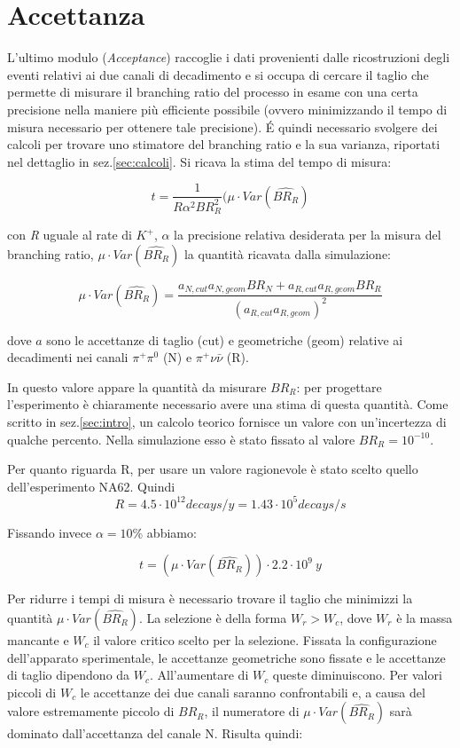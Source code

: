 \documentclass[8pt]{extarticle}
\begin{document}
\section{Accettanza} \label{sec:acceptance}
L'ultimo modulo (\textit{Acceptance}) raccoglie i dati provenienti dalle ricostruzioni degli eventi relativi ai due canali di decadimento e si occupa di cercare il taglio che permette di misurare il branching ratio del processo in esame con una certa precisione nella maniere più efficiente possibile (ovvero minimizzando il tempo di misura necessario per ottenere tale precisione). \'E quindi necessario svolgere dei calcoli per trovare uno stimatore del branching ratio e la sua varianza, riportati nel dettaglio in sez.\ref{sec:calcoli}. Si ricava la stima del tempo di misura:

$$
t = \frac{1}{R \alpha^2 BR_R^2} (\mu \cdot Var(\widehat{BR_R})
$$

con \textit{R} uguale al rate di $K^+$, $\alpha$ la precisione relativa desiderata per la misura del branching ratio, $\mu \cdot Var(\widehat{BR_R})$ la quantità ricavata dalla simulazione: 

\begin{equation}
\mu \cdot Var(\widehat{BR_R}) = \frac{a_{N,cut}a_{N,geom}BR_N + a_{R,cut}a_{R,geom}BR_R}{(a_{R,cut}a_{R,geom})^2}
\end{equation}

dove $a$ sono le accettanze di taglio (cut) e geometriche (geom) relative ai decadimenti nei canali $\pi^+ \pi^0$ (N) e $\pi^+ \nu \bar{\nu}$ (R).

In questo valore appare la quantità da misurare $BR_R$: per progettare l'esperimento è chiaramente necessario avere una stima di questa quantità. Come scritto in sez.\ref{sec:intro}, un calcolo teorico fornisce un valore con un'incertezza di qualche percento\cite{br teorico}. Nella simulazione esso è stato fissato al valore $BR_R = 10^{-10}$.

Per quanto riguarda R, per usare un valore ragionevole è stato scelto quello dell'esperimento NA62\cite{NA62 flux}. Quindi
$$
R = 4.5 \cdot 10^{12} decays/y = 1.43 \cdot 10^5 decays/s
$$

Fissando invece $\alpha = 10\%$ abbiamo:

$$
t = (\mu \cdot Var(\widehat{BR_R})) \cdot 2.2 \cdot 10^9\ y
$$

Per ridurre i tempi di misura è necessario trovare il taglio che minimizzi la quantità $\mu \cdot Var(\widehat{BR_R})$. 
La selezione è della forma $W_r > W_c$, dove $W_r$ è la massa mancante e $W_c$ il valore critico scelto per la selezione. Fissata la configurazione dell'apparato sperimentale, le accettanze geometriche sono fissate e le accettanze di taglio dipendono da $W_c$. All'aumentare di $W_c$ queste diminuiscono. Per valori piccoli di $W_c$ le accettanze dei due canali saranno confrontabili e, a causa del valore estremamente piccolo di $BR_R$, il numeratore di $\mu \cdot Var(\widehat{BR_R})$ sarà dominato dall'accettanza del canale N. Risulta quindi:
\end{document}
